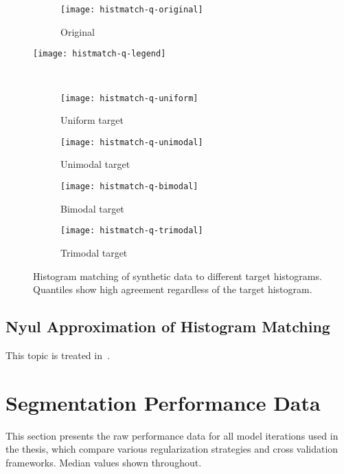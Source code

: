 \begin{figure}
  \centering
  \begin{subfigure}{\plotwidth}
    \texttt{[image: histmatch-q-original]}
    \caption{Original}
  \end{subfigure}
  \parbox[c]{\plotwidth}{\texttt{[image: histmatch-q-legend]}}\\
  \begin{subfigure}{\plotwidth}
    \texttt{[image: histmatch-q-uniform]}
    \caption{Uniform target}
  \end{subfigure}
  \begin{subfigure}{\plotwidth}
    \texttt{[image: histmatch-q-unimodal]}
    \caption{Unimodal target}
  \end{subfigure}
  \begin{subfigure}{\plotwidth}
    \texttt{[image: histmatch-q-bimodal]}
    \caption{Bimodal target}
  \end{subfigure}
  \begin{subfigure}{\plotwidth}
    \texttt{[image: histmatch-q-trimodal]}
    \caption{Trimodal target}
  \end{subfigure}
  \caption{Histogram matching of synthetic data to different target histograms.
    Quantiles show high agreement regardless of the target histogram.}%
  \label{fig:hm-vs-he}
\end{figure}
\subsection{Nyul Approximation of Histogram Matching}\label{ss:nyul-approx}
This topic is treated in~\cite{Knight2017}.
\clearpage
\section{Segmentation Performance Data}
This section presents the raw performance data for all model iterations used in the thesis,
which compare various regularization strategies and cross validation frameworks.
Median values shown throughout.
\begin{singlespace}
  \centering
  \edef\tablistfun{\unexpanded{\foreach\cap/\file in }{\unexpanded\expandafter{\tablist}}}%
  \tablistfun{\begin{minipage}{\plotwidth}%
      {\centering\cap\par\vspace{0.5em}}\vspace{1em}%
  \end{minipage} }
\end{singlespace}
